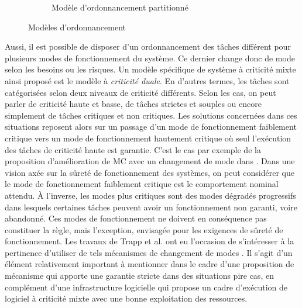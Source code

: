 \documentclass[french, a4paper, 11pt, twoside, pdftex]{StyleThese}
\begin{document}
\begin{figure}[h!]
\begin{subfigure}{.45\textwidth}
    		\caption{Modèle d'ordonnancement partitionné}
    		\label{fig:partitionnedScheduling}
    	\end{subfigure}
    	\caption{Modèles d'ordonnancement}
    	\label{fig:SchedulingModels}
    \end{figure}
        
    Aussi, il est possible de disposer d'un ordonnancement des tâches différent pour plusieurs modes de fonctionnement du système. Ce dernier change donc de mode selon les besoins ou les risques. Un modèle spécifique de système à criticité mixte ainsi proposé est le modèle à \textit{criticité duale}. En d'autres termes, les tâches sont catégorisées selon deux niveaux de criticité différents. Selon les cas, on peut parler de criticité haute et basse, de tâches strictes et souples ou encore simplement de tâches critiques et non critiques. Les solutions concernées dans ces situations reposent alors sur un passage d'un mode de fonctionnement faiblement critique vers un mode de fonctionnement hautement critique où seul l'exécution des tâches de criticité haute est garantie. C'est le cas par exemple de la proposition d'amélioration de MC avec un changement de mode dans \cite{chisholm_supporting_2017}. Dans une vision axée sur la sûreté de fonctionnement des systèmes, on peut considérer que le mode de fonctionnement faiblement critique est le comportement nominal attendu. À l'inverse, les modes plus critiques sont des modes dégradés progressifs dans lesquels certaines tâches peuvent avoir un fonctionnement non garanti, voire abandonné. Ces modes de fonctionnement ne doivent en conséquence pas constituer la règle, mais l'exception, envisagée pour les exigences de sûreté de fonctionnement. Les travaux de Trapp et al. ont eu l'occasion de s'intéresser à la pertinence d'utiliser de tels mécanismes de changement de modes \cite{trapp_runtime_2007}. Il s'agit d'un élément relativement important à mentionner dans le cadre d'une proposition de mécanisme qui apporte une garantie stricte dans des situations pire cas, en complément d'une infrastructure logicielle qui propose un cadre d'exécution de logiciel à criticité mixte avec une bonne exploitation des ressources.
    
\end{document}
